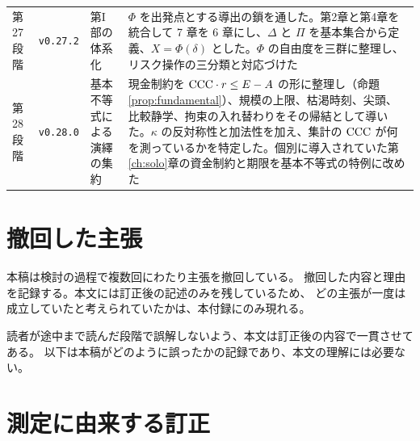 \begin{longtable}{@{}ll>{\raggedright\arraybackslash}p{}>{\raggedright\arraybackslash}p{}@{}}
第27段階 & \texttt{v0.27.2} & 第I部の体系化 & $\Phi$ を出発点とする導出の鎖を通した。第2章と第4章を統合して 7 章を 6 章にし、$\Delta$ と $\Pi$ を基本集合から定義、$X=\Phi(\delta)$ とした。$\Phi$ の自由度を三群に整理し、リスク操作の三分類と対応づけた \\
第28段階 & \texttt{v0.28.0} & 基本不等式による演繹の集約 & 現金制約を $\mathrm{CCC}\cdot r\leq E-A$ の形に整理し（命題\ref{prop:fundamental}）、規模の上限、枯渇時刻、尖頭、比較静学、拘束の入れ替わりをその帰結として導いた。$\kappa$ の反対称性と加法性を加え、集計の $\mathrm{CCC}$ が何を測っているかを特定した。個別に導入されていた第\ref{ch:solo}章の資金制約と期限を基本不等式の特例に改めた \\
\end{longtable}


\section{撤回した主張}

本稿は検討の過程で複数回にわたり主張を撤回している。
撤回した内容と理由を記録する。本文には訂正後の記述のみを残しているため、
どの主張が一度は成立していたと考えられていたかは、本付録にのみ現れる。

読者が途中まで読んだ段階で誤解しないよう、本文は訂正後の内容で一貫させてある。
以下は本稿がどのように誤ったかの記録であり、本文の理解には必要ない。

\section{測定に由来する訂正}

